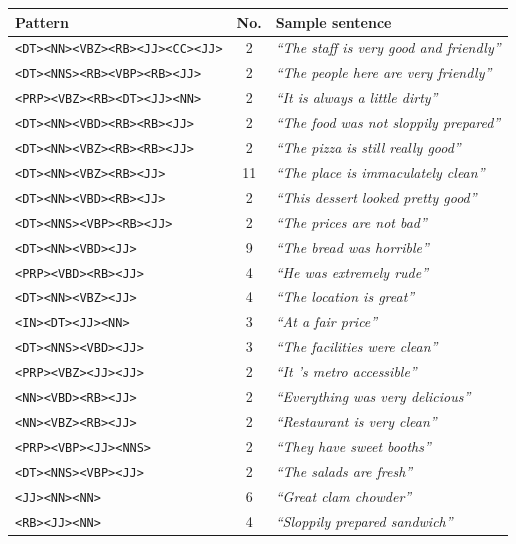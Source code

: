 \documentclass[a4paper,11pt]{kth-mag}
\begin{document}
\begin{table}[t]
  \centering
  \begin{tabular}{| l | c | l |}
    \hline
    \textbf{Pattern} &\textbf{No.} & \textbf{Sample sentence} \\ \hline
    \texttt{<DT><NN><VBZ><RB><JJ><CC><JJ>} & 2 & \emph{``The staff is very good and friendly''}\\
    \texttt{<DT><NNS><RB><VBP><RB><JJ>} & 2 & \emph{``The people here are very friendly''}\\
    \texttt{<PRP><VBZ><RB><DT><JJ><NN>} & 2 & \emph{``It is always a little dirty''}\\
    \texttt{<DT><NN><VBD><RB><RB><JJ>} & 2 & \emph{``The food was not sloppily prepared''}\\
    \texttt{<DT><NN><VBZ><RB><RB><JJ>} & 2 & \emph{``The pizza is still really good''}\\
    \texttt{<DT><NN><VBZ><RB><JJ>} & 11 & \emph{``The place is immaculately clean''}\\
    \texttt{<DT><NN><VBD><RB><JJ>} & 2 & \emph{``This dessert looked pretty good''}\\
    \texttt{<DT><NNS><VBP><RB><JJ>} & 2 & \emph{``The prices are not bad''}\\
    \texttt{<DT><NN><VBD><JJ>} & 9 & \emph{``The bread was horrible''}\\
    \texttt{<PRP><VBD><RB><JJ>} & 4 & \emph{``He was extremely rude''}\\
    \texttt{<DT><NN><VBZ><JJ>} & 4 & \emph{``The location is great''}\\
    \texttt{<IN><DT><JJ><NN>} & 3 & \emph{``At a fair price''}\\
    \texttt{<DT><NNS><VBD><JJ>} & 3 & \emph{``The facilities were clean''}\\
    \texttt{<PRP><VBZ><JJ><JJ>} & 2 & \emph{``It 's metro accessible''}\\
    \texttt{<NN><VBD><RB><JJ>} & 2 & \emph{``Everything was very delicious''}\\
    \texttt{<NN><VBZ><RB><JJ>} & 2 & \emph{``Restaurant is very clean''}\\
    \texttt{<PRP><VBP><JJ><NNS>} & 2 & \emph{``They have sweet booths''}\\
    \texttt{<DT><NNS><VBP><JJ>} & 2 & \emph{``The salads are fresh''}\\
    \texttt{<JJ><NN><NN>} & 6 & \emph{``Great clam chowder''}\\
    \texttt{<RB><JJ><NN>} & 4 & \emph{``Sloppily prepared sandwich''}\\

\end{tabular}
\end{table}
\end{document}

